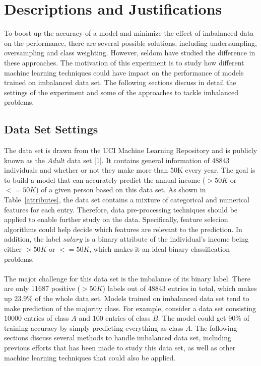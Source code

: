 \documentclass{article}
\begin{document}
\section{Descriptions and Justifications}
\label{headings}

To boost up the accuracy of a model and minimize the effect of imbalanced data on the performance, there are several possible solutions, including undersampling, oversampling and class weighting. However, seldom have studied the difference in these approaches. The motivation of this experiment is to study how different machine learning techniques could have impact on the performance of models trained on imbalanced data set. The following sections discuss in detail the settings of the experiment and some of the approaches to tackle imbalanced problems.

\subsection{Data Set Settings}
The data set is drawn from the UCI Machine Learning Repository and is publicly known as the $Adult$ data set [1]. It contains general information of 48843 individuals and whether or not they make more than 50K every year. The goal is to build a model that can accurately predict the annual income ($>50K$ or $<=50K$) of a given person based on this data set. As shown in Table~\ref{attributes}, the data set contains a mixture of categorical and numerical features for each entry. Therefore, data pre-processing techniques should be applied to enable further study on the data. Specifically, feature selecion algorithms could help decide which features are relevant to the prediction. In addition, the label $salary$ is a binary attribute of the individual's income being either $>50K$ or $<=50K$, which makes it an ideal binary classification problems.\\\\
The major challenge for this data set is the imbalance of its binary label. There are only 11687 positive ($>50K$) labels out of 48843 entries in total, which makes up $23.9\%$ of the whole data set. Models trained on imbalanced data set tend to make prediction of the majority class. For example, consider a data set consisting $10000$ entries of class $A$ and $100$ entries of class $B$. The model could get 90\% of training accuracy by simply predicting everything as class $A$. The following sections discuss several methods to handle imbalanced data set, including previous efforts that has been made to study this data set, as well as other machine learning techniques that could also be applied.
\end{document}
